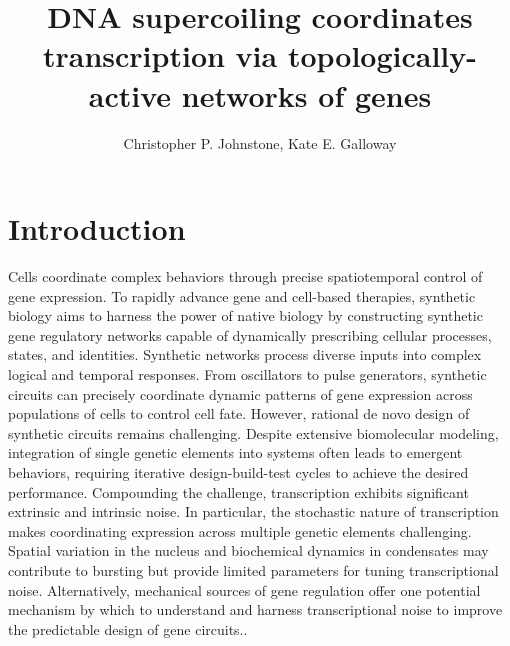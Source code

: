 \documentclass[11pt]{article}
\title{DNA supercoiling coordinates transcription via topologically-active networks of genes }
\author{Christopher P. Johnstone, Kate E. Galloway}
\date{ }
\begin{document}
\maketitle

\section{Introduction}
Cells coordinate complex behaviors through precise spatiotemporal control of gene expression. To rapidly advance gene and cell-based therapies, synthetic biology aims to harness the power of native biology by constructing synthetic gene regulatory networks capable of dynamically prescribing cellular processes, states, and identities.\parencite{chenSyntheticBiologyAdvancing2012,beitzSyntheticGeneCircuits2022,purnickSecondWaveSynthetic2009,elowitzBuildLifeUnderstand2010}
Synthetic networks process diverse inputs into complex logical and temporal responses.\parencite{weinbergLargescaleDesignRobust2017,xieMultiInputRNAiBasedLogic2011,taborSyntheticGeneticEdge2009}
From oscillators to pulse generators, synthetic circuits can  precisely coordinate dynamic patterns of gene expression across populations of cells to control cell fate.\parencite{gardnerConstructionGeneticToggle2000,elowitzSyntheticOscillatoryNetwork2000,strickerFastRobustTunable2008,daninoSynchronizedQuorumGenetic2010,maSyntheticMammalianSignaling2020a,parkEngineeringEpigeneticRegulation2019,bashorUsingEngineeredScaffold2008,gallowayDynamicallyReshapingSignaling2013}
However, rational de novo design of synthetic circuits remains challenging. Despite extensive biomolecular modeling, integration of single genetic elements into systems often leads to emergent behaviors, requiring iterative design-build-test cycles to achieve the desired performance.\parencite{jonesEndoribonucleasebasedFeedforwardController2020,freiCharacterizationMitigationGene2020,qianResourceCompetitionShapes2017}
Compounding the challenge, transcription exhibits significant extrinsic and intrinsic noise.\parencite{toNoiseCanInduce2010,zopfCellCycleDependenceTranscription2013,desaiDNArepairPathwayCan2021}
In particular, the stochastic nature of transcription makes coordinating expression across multiple genetic elements challenging.\parencite{rodriguezIntrinsicDynamicsHuman2019,rodriguezTranscriptionLivingCells2020,quartonUncouplingGeneExpression2020}
Spatial variation in the nucleus and biochemical dynamics in condensates may contribute to bursting but provide limited parameters for tuning transcriptional noise.\parencite{henningerRNAMediatedFeedbackControl2020,guoPolIIPhosphorylation2019}
Alternatively, mechanical sources of gene regulation offer one potential mechanism by which to understand and harness transcriptional noise to improve the predictable design of gene circuits.\parencite{johnstoneEngineeringCellularSymphonies2021,anconaTranscriptionalBurstsNonequilibrium2019a,kimLongDistanceCooperativeAntagonistic2019,elhoudaiguiBacterialGenomeArchitecture2019a,meyerTorsionMediatedInteractionAdjacent2014}.
\end{document}
